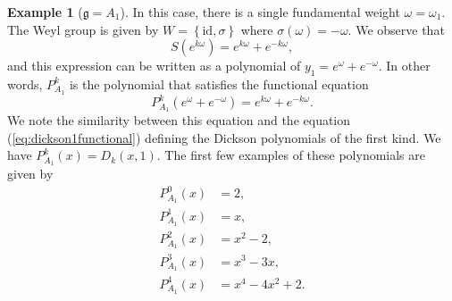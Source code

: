 \documentclass{amsart}
\newcommand{\mf}{\mathfrak}
\numberwithin{equation}{section}
\theoremstyle{plain}
\theoremstyle{definition}
\newtheorem{example}[theorem]{Example}
\begin{document}
\begin{example}[$\mf{g}=A_1$]	
In this case, there is a single fundamental weight $\omega=\omega_1$. The Weyl group is given by $W=\left\{\text{id},\sigma\right\}$ where $\sigma(\omega)=-\omega$. We observe that
$$
S(e^{k\omega})=e^{k\omega}+e^{-k\omega},
$$
and this expression can be written as a polynomial of $y_1 = e^\omega+e^{-\omega}$. In other words, $P^k_{A_1}$ is the polynomial that satisfies the functional equation
\begin{equation}\label{eq:PA1functionalformal}
	P^k_{A_1}(e^\omega+e^{-\omega})=e^{k\omega}+e^{-k\omega}.
\end{equation}
We note the similarity between this equation and the equation  (\ref{eq:dickson1functional}) defining the Dickson polynomials of the first kind. We have $P_{A_1}^k(x) = D_k(x,1)$. The first few examples of these polynomials are given by
\begin{align*}
	P^0_{A_1}(x)&=2,\\
	P^1_{A_1}(x)&=x,\\
	P^2_{A_1}(x)&=x^2-2,\\
	P^3_{A_1}(x)&=x^3-3x,\\
	P^4_{A_1}(x)&=x^4-4x^2+2.
\end{align*}
\end{example}
\end{document}
